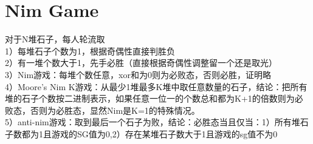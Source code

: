 \documentclass[a4paper,10pt]{report}
\begin{document}
	\section{Nim Game}
		对于N堆石子，每人轮流取\\
		1）每堆石子个数为1，根据奇偶性直接判胜负\\
		2）有一堆个数大于1，先手必胜（直接根据奇偶性调整留一个还是取光）\\
		3）Nim游戏：每堆个数任意，xor和为0则为必败态，否则必胜，证明略\\
		4）Moore's Nim K游戏：从最少1堆最多K堆中取任意数量的石子，结论：把所有堆的石子个数按二进制表示，如果任意一位一的个数总和都为K+1的倍数则为必败态，否则为必胜态，显然Nim是K=1的特殊情况。\\
		5）anti-nim游戏：取到最后一个石子为败，结论：必胜态当且仅当：1）所有堆石子数都为1且游戏的SG值为0,2）存在某堆石子数大于1且游戏的sg值不为0\\
\end{document}

